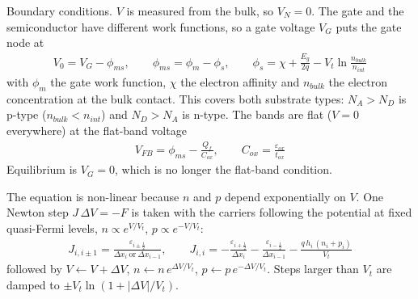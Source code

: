 \documentclass[11pt]{article}
\newcommand{\half}{\tfrac{1}{2}}
\begin{document}
Boundary conditions. $V$ is measured from the bulk, so $V_N=0$. The gate and the semiconductor have
different work functions, so a gate voltage $V_G$ puts the gate node at
\begin{align}
V_0=V_G-\phi_{ms},\qquad \phi_{ms}=\phi_m-\phi_s,\qquad
\phi_s=\chi+\frac{E_g}{2q}-V_t\ln\frac{n_{bulk}}{n_{int}}
\end{align}
with $\phi_m$ the gate work function, $\chi$ the electron affinity and $n_{bulk}$ the electron
concentration at the bulk contact. This covers both substrate types: $N_A>N_D$ is p-type
($n_{bulk}<n_{int}$) and $N_D>N_A$ is n-type. The bands are flat ($V=0$ everywhere) at the flat-band voltage
\begin{align}
V_{FB}=\phi_{ms}-\frac{Q_f}{C_{ox}},\qquad C_{ox}=\frac{\varepsilon_{ox}}{t_{ox}}
\end{align}
Equilibrium is $V_G=0$, which is no longer the flat-band condition.

The equation is non-linear because $n$ and $p$ depend exponentially on $V$. One Newton step
$J\,\Delta V=-F$ is taken with the carriers following the potential at fixed quasi-Fermi levels,
$n\propto e^{V/V_t}$, $p\propto e^{-V/V_t}$:
\begin{align}
J_{i,i\pm1} = \frac{\varepsilon_{i\pm\half}}{\Delta x_{i}\ \text{or}\ \Delta x_{i-1}},\qquad
J_{i,i} = -\frac{\varepsilon_{i+\half}}{\Delta x_i}-\frac{\varepsilon_{i-\half}}{\Delta x_{i-1}}-\frac{q\,h_i\,(n_i+p_i)}{V_t}
\end{align}
followed by $V\leftarrow V+\Delta V$, $n\leftarrow n\,e^{\Delta V/V_t}$, $p\leftarrow p\,e^{-\Delta V/V_t}$.
Steps larger than $V_t$ are damped to $\pm V_t\ln\!\left(1+|\Delta V|/V_t\right)$.
\end{document}
